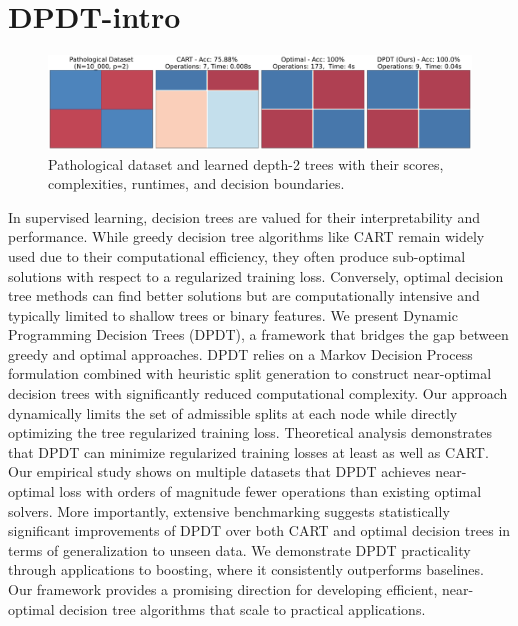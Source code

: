 \chapter{DPDT-intro}
\begin{figure}
    \includegraphics[width=\textwidth]{images/figures/patho_bounds_comparison_checkers.pdf}
    \caption{Pathological dataset and learned depth-2 trees with their scores, complexities, runtimes, and decision boundaries.}
    \label{fig:patho}
\end{figure}
In supervised learning, decision trees are valued for their interpretability and performance. 
While greedy decision tree algorithms like CART remain widely used due to their computational efficiency, they often produce sub-optimal solutions with respect to a regularized training loss. 
Conversely, optimal decision tree methods can find better solutions but are computationally intensive and typically limited to shallow trees or binary features. We present Dynamic Programming Decision Trees (DPDT), a framework that bridges the gap between greedy and optimal approaches. 
DPDT relies on a Markov Decision Process formulation combined with heuristic split generation to construct near-optimal decision trees with significantly reduced computational complexity. 
Our approach dynamically limits the set of admissible splits at each node while directly optimizing the tree regularized training loss. Theoretical analysis demonstrates that DPDT can minimize regularized training losses at least as well as CART\@. 
Our empirical study shows on multiple datasets that DPDT achieves near-optimal loss with orders of magnitude fewer operations than existing optimal solvers. 
More importantly, extensive benchmarking suggests statistically significant improvements of DPDT over both CART and optimal decision trees in terms of generalization to unseen data. We demonstrate DPDT practicality through applications to boosting, where it consistently outperforms baselines. 
Our framework provides a promising direction for developing efficient, near-optimal decision tree algorithms that scale to practical applications.

